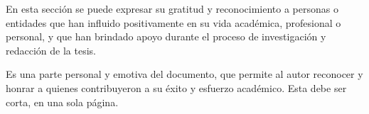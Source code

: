 En esta sección se puede expresar su gratitud y reconocimiento a personas o entidades que han influido positivamente en su vida académica, profesional o personal, y que han brindado apoyo durante el proceso de investigación y redacción de la tesis. 

Es una parte personal y emotiva del documento, que permite al autor reconocer y honrar a quienes contribuyeron a su éxito y esfuerzo académico. Esta debe ser corta, en una sola página.